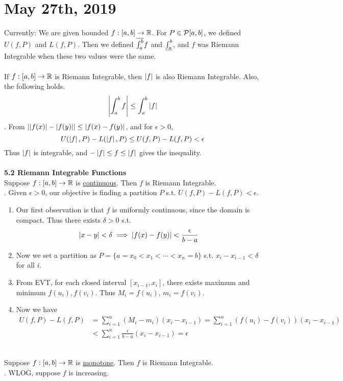 \section*{May 27th, 2019}
Currently: We are given bounded $f: [a, b]\rightarrow\mathbb{R}$. For $P\in \mathcal{P}[a, b]$, we defined $U(f, P)$ and $L(f, P)$. Then we defined $\overline{\int_a^b} f$ and $\underline{\int_a^b}$, and $f$ was Riemann Integrable when these two values were the same.\\
\\
 If $f:[a, b]\rightarrow\mathbb{R}$ is Riemann Integrable, then $\left|f\right|$ is also Riemann Integrable. Also, the following holds.$$ \left|\int_a^b f\right| \leq\int_a^b \left|f\right| $$
\pf. From $\left|\left|f(x)\right| - \left|f(y)\right|\right| \leq \left|f(x)-f(y)\right|$, and for $\epsilon > 0$, $$U(\left|f\right|, P) - L(\left|f\right|, P) \leq U(f, P) - L(f, P) < \epsilon$$
Thus $\left|f\right|$ is integrable, and $-\left|f\right|\leq f \leq \left|f\right|$ gives the inequality.\\
\\
\textbf{5.2 Riemann Integrable Functions}\\
 Suppose $f:[a, b]\rightarrow\mathbb{R}$ is \underline{continuous}. Then $f$ is Riemann Integrable.\\
\pf. Given $\epsilon > 0$, our objective is finding a  partition $P$ s.t. $U(f, P) - L(f, P) < \epsilon$.
\begin{enumerate}
	\item Our first observation is that $f$ is uniformly continuous, since the domain is compact.
	Thus there exists $\delta >0$ s.t. $$\left|x-y\right| < \delta \implies \left|f(x) - f(y)\right| < \frac{\epsilon}{b-a}$$
	\item Now we set a partition as $P = \{a=x_0 < x_1  < \cdots < x_n =b\}$ s.t. $x_i-x_{i-1} < \delta$ for all $i$.
	\item From EVT, for each closed interval $[x_{i-1}, x_i]$, there exists maximum and minimum $f(u_i), f(v_i)$. Thus $M_i = f(u_i)$, $m_i = f(v_i)$.
	\item Now we have
	$$\begin{aligned}
		U(f, P) - L(f, P) &= \sum_{i=1}^n (M_i-m_i)(x_i - x_{i-1}) = \sum_{i=1}^n (f(u_i) - f(v_i)) (x_i -x_{i-1}) \\&< \sum_{i=1}^n \frac{\epsilon}{b-a} (x_i - x_{i-1}) = \epsilon
	\end{aligned}$$
\end{enumerate}
~\\
 Suppose $f:[a, b]\rightarrow\mathbb{R}$ is \underline{monotone}. Then $f$ is Riemann Integrable.\\
\pf. WLOG, suppose $f$ is increasing.\\
